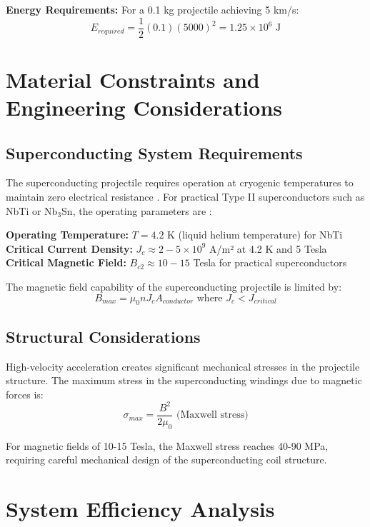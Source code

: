\documentclass[12pt,a4paper]{article}
\begin{document}
\textbf{Energy Requirements:}
For a 0.1 kg projectile achieving 5 km/s:
\begin{equation}
E_{required} = \frac{1}{2}(0.1)(5000)^2 = 1.25 \times 10^6 \text{ J}
\end{equation}

\section{Material Constraints and Engineering Considerations}

\subsection{Superconducting System Requirements}

The superconducting projectile requires operation at cryogenic temperatures to maintain zero electrical resistance \cite{ref6}. For practical Type II superconductors such as NbTi or Nb$_3$Sn, the operating parameters are \cite{ref5,ref6}:

\textbf{Operating Temperature:} $T = 4.2$ K (liquid helium temperature) for NbTi
\textbf{Critical Current Density:} $J_c \approx 2-5 \times 10^9$ A/m² at 4.2 K and 5 Tesla
\textbf{Critical Magnetic Field:} $B_{c2} \approx 10-15$ Tesla for practical superconductors

The magnetic field capability of the superconducting projectile is limited by:
\begin{equation}
B_{max} = \mu_0 n J_c A_{conductor} \text{ where } J_c < J_{critical}
\end{equation}

\subsection{Structural Considerations}

High-velocity acceleration creates significant mechanical stresses in the projectile structure. The maximum stress in the superconducting windings due to magnetic forces is:
\begin{equation}
\sigma_{max} = \frac{B^2}{2\mu_0} \text{ (Maxwell stress)}
\end{equation}

For magnetic fields of 10-15 Tesla, the Maxwell stress reaches 40-90 MPa, requiring careful mechanical design of the superconducting coil structure.

\section{System Efficiency Analysis}
\end{document}

